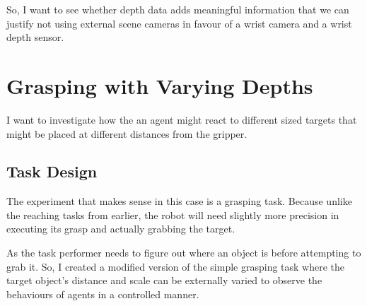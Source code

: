 So, I want to see whether depth data adds meaningful information that we can justify not using external scene cameras in favour of a wrist camera and a wrist depth sensor.

\section{Grasping with Varying Depths}
I want to investigate how the an agent might react to different sized targets that might be placed at different distances from the gripper.

\subsection{Task Design}
The experiment that makes sense in this case is a grasping task. Because unlike the reaching tasks from earlier, the robot will need slightly more precision in executing its grasp and actually grabbing the target.

As the task performer needs to figure out where an object is before attempting to grab it. So, I created a modified version of the simple grasping task where the target object's distance and scale can be externally varied to observe the behaviours of agents in a controlled manner.

